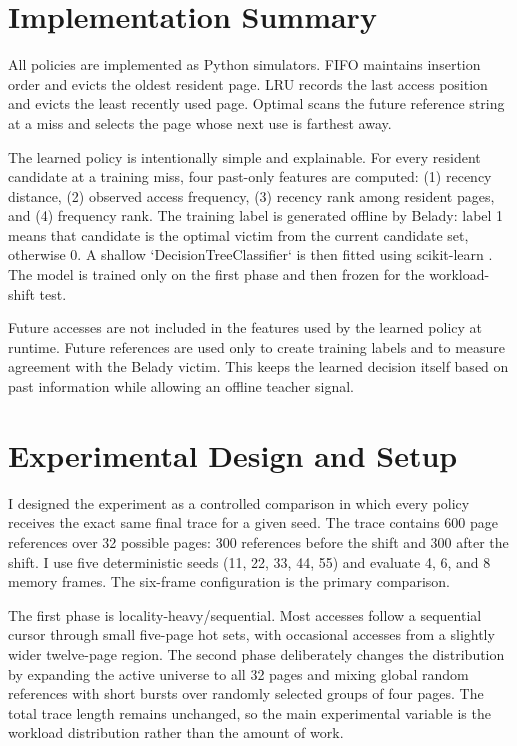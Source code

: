 \documentclass[10pt]{article}
\begin{document}
\section{Implementation Summary}
All policies are implemented as Python simulators. FIFO maintains insertion order and evicts the oldest resident page. LRU records the last access position and evicts the least recently used page. Optimal scans the future reference string at a miss and selects the page whose next use is farthest away.

The learned policy is intentionally simple and explainable. For every resident candidate at a training miss, four past-only features are computed: (1) recency distance, (2) observed access frequency, (3) recency rank among resident pages, and (4) frequency rank. The training label is generated offline by Belady: label 1 means that candidate is the optimal victim from the current candidate set, otherwise 0. A shallow `DecisionTreeClassifier` is then fitted using scikit-learn \cite{sklearn}. The model is trained only on the first phase and then frozen for the workload-shift test.

Future accesses are not included in the features used by the learned policy at runtime. Future references are used only to create training labels and to measure agreement with the Belady victim. This keeps the learned decision itself based on past information while allowing an offline teacher signal.

\section{Experimental Design and Setup}
I designed the experiment as a controlled comparison in which every policy receives the exact same final trace for a given seed. The trace contains 600 page references over 32 possible pages: 300 references before the shift and 300 after the shift. I use five deterministic seeds (11, 22, 33, 44, 55) and evaluate 4, 6, and 8 memory frames. The six-frame configuration is the primary comparison.

The first phase is locality-heavy/sequential. Most accesses follow a sequential cursor through small five-page hot sets, with occasional accesses from a slightly wider twelve-page region. The second phase deliberately changes the distribution by expanding the active universe to all 32 pages and mixing global random references with short bursts over randomly selected groups of four pages. The total trace length remains unchanged, so the main experimental variable is the workload distribution rather than the amount of work.
\end{document}
